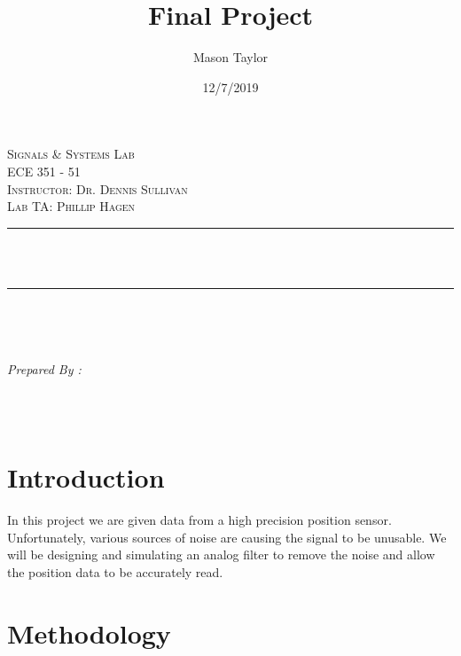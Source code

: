 \documentclass[12pt]{report}
\title{Final Project}
\date{12/7/2019}
\author{Mason Taylor}
\makeatletter
\let\thetitle\@title
\let\theauthor\@author
\let\thedate\@date
\makeatother
\begin{document}
    
    
\addtolength{\topmargin}{-1cm}
\setlength{\headsep}{0.2in}
\setlength{\textheight}{9.3in}
\begin{titlepage}
\centering
\begin{center}    
\textsc{\Large Signals \& Systems Lab}\\[2.0 cm]	
\textsc{\Large ECE 351 - 51}\\[0.5 cm]
\textsc{\small Instructor: Dr. Dennis Sullivan}\\[0.5 cm]
\textsc{\small Lab TA: Phillip Hagen}
\end{center}
\rule{\linewidth}{0.4 mm} \\[0.4 cm]
{ \huge \bfseries \thetitle}\\
\rule{\linewidth}{0.4 mm} \\[1.5 cm]

\begin{minipage}{0.4\textwidth}
\begin{flushleft} \large
\end{flushleft}
\end{minipage}~
\begin{minipage}{0.4\textwidth}

\begin{flushright} \large
\emph{Prepared By :} \\
\theauthor  \\
\thedate
\end{flushright}  
\end{minipage}\\[2 cm]
\end{titlepage}
\tableofcontents
\pagebreak


    
\hypertarget{introduction}{%
\chapter{Introduction}\label{introduction}}

In this project we are given data from a high precision position sensor.
Unfortunately, various sources of noise are causing the signal to be
unusable. We will be designing and simulating an analog filter to remove
the noise and allow the position data to be accurately read.

\hypertarget{methodology}{%
\chapter{Methodology}\label{methodology}}
\end{document}
